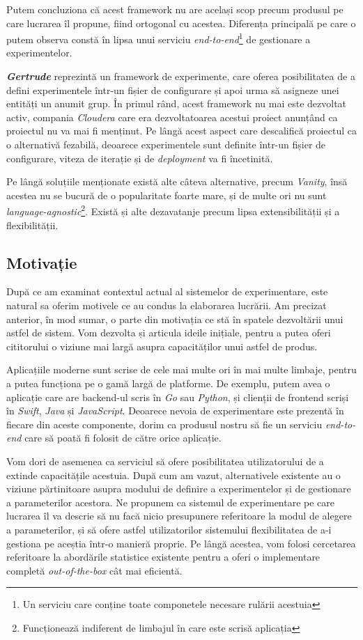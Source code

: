 Putem concluziona că acest framework nu are același scop precum produsul pe care lucrarea îl propune, fiind ortogonal cu acestea. Diferența principală pe care o putem observa constă în lipsa unui serviciu \textit{end-to-end}\footnote{Un serviciu care conține toate componetele necesare rulării acestuia} de gestionare a experimentelor.

\textbf{\textit{Gertrude}} reprezintă un framework de experimente, care oferea posibilitatea de a defini experimentele într-un fișier de configurare și apoi urma să asigneze unei entități un anumit grup. În primul rând, acest framework nu mai este dezvoltat activ, compania \textit{Cloudera} care era dezvoltatoarea acestui proiect anunțând ca proiectul nu va mai fi menținut. Pe lângă acest aspect care descalifică proiectul ca o alternativă fezabilă, deoarece experimentele sunt definite într-un fișier de configurare, viteza de iterație și de \textit{deployment} va fi încetinită. 

Pe lângă soluțiile menționate există alte câteva alternative, precum \textit{Vanity}, însă acestea nu se bucură de o popularitate foarte mare, și de multe ori nu sunt \textit{language-agnostic}\footnote{Funcționează indiferent de limbajul în care este scrisă aplicația}. Există și alte dezavatanje precum lipsa extensibilității și a flexibilității.

\subsection{Motivație}

După ce am examinat contextul actual al sistemelor de experimentare, este natural sa oferim motivele ce au condus la elaborarea lucrării. Am precizat anterior, în mod sumar, o parte din motivația ce stă în spatele dezvoltării unui astfel de sistem. Vom dezvolta și articula ideile inițiale, pentru a putea oferi cititorului o viziune mai largă asupra capacităților unui astfel de produs.

Aplicațiile moderne sunt scrise de cele mai multe ori în mai multe limbaje, pentru a putea funcționa pe o gamă largă de platforme. De exemplu, putem avea o aplicație care are backend-ul scris în \textit{Go} sau \textit{Python}, și clienții de frontend scriși în \textit{Swift}, \textit{Java} și \textit{JavaScript}. Deoarece nevoia de experimentare este prezentă în fiecare din aceste componente, dorim ca produsul nostru să fie un serviciu \textit{end-to-end} care să poată fi folosit de către orice aplicație. 

Vom dori de asemenea ca serviciul să ofere posibilitatea utilizatorului de a extinde capacitățile acestuia. După cum am vazut, alternativele existente au o viziune părtinitoare asupra modului de definire a experimentelor și de gestionare a parameterilor acestora. Ne propunem ca sistemul de experimentare pe care lucrarea îl va descrie să nu facă nicio presupunere referitoare la modul de alegere a parameterilor, și să ofere astfel utilizatorilor sistemului flexibilitatea de a-i gestiona pe aceștia într-o manieră proprie. Pe lângă acestea, vom folosi cercetarea referitoare la abordările statistice existente pentru a oferi o implementare completă \textit{out-of-the-box} cât mai eficientă.

